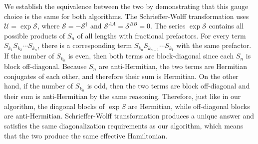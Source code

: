 We establish the equivalence between the two by demonstrating that this gauge
choice is the same for both algorithms.
The Schrieffer-Wolff transformation uses $\mathcal{U} = \exp \mathcal{S}$,
where $\mathcal{S} = -\mathcal{S}^\dagger$ and $\mathcal{S}^{AA} =
\mathcal{S}^{BB} = 0$.
The series $\exp\mathcal{S}$ contains all possible products of $S_n$ of all
lengths with fractional prefactors.
For every term $S_{k_1}S_{k_2}\cdots S_{k_n}$, there is a corresponding term
$S_{k_n}S_{k_{n-1}}\cdots S_{k_1}$ with the same prefactor.
If the number of $S_{k_n}$ is even, then both terms are block-diagonal since
each $S_n$ is block off-diagonal.
Because $S_n$ are anti-Hermitian, the two terms are Hermitian conjugates of each
other, and therefore their sum is Hermitian.
On the other hand, if the number of $S_{k_n}$ is odd, then the two terms are
block off-diagonal and their sum is anti-Hermitian by the same reasoning.
Therefore, just like in our algorithm, the diagonal blocks of $\exp S$ are
Hermitian, while off-diagonal blocks are anti-Hermitian.
Schrieffer-Wolff transformation produces a unique answer and satisfies the same
diagonalization requirements as our algorithm, which means that the two produce
the same effective Hamiltonian.

